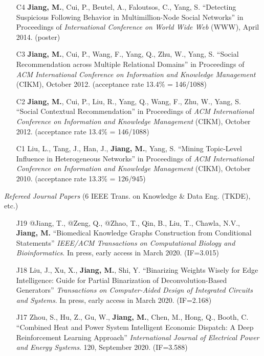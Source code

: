 \documentclass[10pt]{article}
\newenvironment{myindentpar}[1]%
{\begin{list}{}%
         {\setlength{\leftmargin}{#1}}%
         \item[]%
}
{\end{list}}
\newcounter{list}
\begin{document}
\begin{myindentpar}{0.00cm}
\begin{enumerate}[leftmargin=.5cm]
\item[C4] \textbf{Jiang, M.}, Cui, P., Beutel, A., Faloutsos, C., Yang, S. ``Detecting Suspicious Following Behavior in Multimillion-Node Social Networks'' in Proceedings of \textit{International Conference on World Wide Web} (WWW), April 2014. (poster)

\item[C3] \textbf{Jiang, M.}, Cui, P., Wang, F., Yang, Q., Zhu, W., Yang, S. ``Social Recommendation across Multiple Relational Domains'' in Proceedings of \textit{ACM International Conference on Information and Knowledge Management} (CIKM), October 2012. (acceptance rate 13.4\% = 146/1088)

\item[C2] \textbf{Jiang, M.}, Cui, P., Liu, R., Yang, Q., Wang, F., Zhu, W., Yang, S. ``Social Contextual Recommendation'' in Proceedings of \textit{ACM International Conference on Information and Knowledge Management} (CIKM), October 2012. (acceptance rate 13.4\% = 146/1088)

\item[C1] Liu, L., Tang, J., Han, J., \textbf{Jiang, M.}, Yang, S. ``Mining Topic-Level Influence in Heterogeneous Networks'' in Proceedings of \textit{ACM International Conference on Information and Knowledge Management} (CIKM), October 2010. (acceptance rate 13.3\% = 126/945)

\end{enumerate}

\hspace{-0.25cm}\textit{Refereed Journal Papers} {\small (6 IEEE Trans. on Knowledge \& Data Eng. (TKDE), etc.)}

\begin{enumerate}[leftmargin=.5cm]

\item[J19] @Jiang, T., @Zeng, Q., @Zhao, T., Qin, B., Liu, T., Chawla, N.V., \textbf{Jiang, M.} ``Biomedical Knowledge Graphs Construction from Conditional Statements'' \textit{IEEE/ACM Transactions on Computational Biology and Bioinformatics}. In press, early access in March 2020. (IF=3.015)

\item[J18] Liu, J., Xu, X., \textbf{Jiang, M.}, Shi, Y. ``Binarizing Weights Wisely for Edge Intelligence: Guide for Partial Binarization of Deconvolution-Based Generators'' \textit{Transactions on Computer-Aided Design of Integrated Circuits and Systems}. In press, early access in March 2020. (IF=2.168)

\item[J17] Zhou, S., Hu, Z., Gu, W., \textbf{Jiang, M.}, Chen, M., Hong, Q., Booth, C. ``Combined Heat and Power System Intelligent Economic Dispatch: A Deep Reinforcement Learning Approach'' \textit{International Journal of Electrical Power and Energy Systems}. 120, September 2020. (IF=3.588)


\end{enumerate}
\end{myindentpar}
\end{document}
